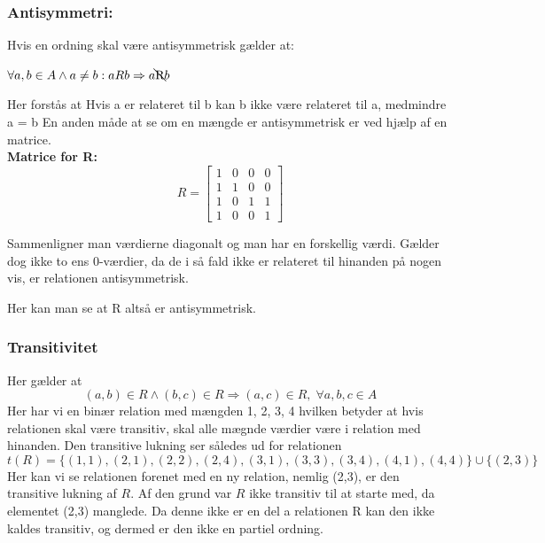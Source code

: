 \documentclass{article}
\begin{document}
\subsubsection{Antisymmetri:}
Hvis en ordning skal være antisymmetrisk gælder at:\par
\begin{center}
\begin{math}
\forall a,b \in A \land a \neq b: aRb \Rightarrow a  $\bcancel{R}$ b
\end{math}
\end{center}


Her forstås at  Hvis a er relateret til b kan b ikke være relateret til a, medmindre a = b
En anden måde at se om en mængde er antisymmetrisk er ved hjælp af en matrice.\\
\textbf{Matrice for R:}\\ 


\[R=\begin{bmatrix}
1 & 0 & 0 & 0\\
1 & 1 & 0 & 0\\
1 & 0 & 1 & 1\\
1 & 0 & 0 & 1
\end{bmatrix}\]


Sammenligner man værdierne diagonalt og man har en forskellig værdi. Gælder dog ikke to ens 0-værdier, da de i så fald ikke er relateret til hinanden på nogen vis, er relationen antisymmetrisk. 

Her kan man se at R altså er antisymmetrisk.

\subsubsection{Transitivitet}
Her gælder at \[(a,b)\in R \wedge (b,c)\in R \Rightarrow (a,c)\in R, \;  \forall a,b,c \in A\]
Her har vi en binær relation med mængden 1, 2, 3, 4 hvilken betyder at hvis relationen skal være transitiv, skal alle mægnde værdier være i relation med hinanden.
Den transitive lukning ser således ud for relationen \[t(R) = \{(1,1), (2,1), (2,2), (2,4), (3,1), (3,3), (3,4), (4,1), (4,4)\} \cup \{(2,3)\}\]
Her kan vi se relationen forenet med en ny relation, nemlig (2,3), er den transitive lukning af $R$. Af den grund var $R$ ikke transitiv til at starte med, da elementet (2,3) manglede. Da denne ikke er en del a relationen R kan den ikke kaldes transitiv, og dermed er den ikke en partiel ordning.

\vspace{0.5cm}
\end{document}
